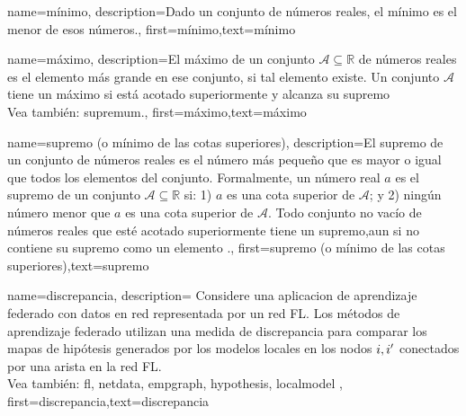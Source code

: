 
{
	name=mínimo,
	description={Dado un conjunto de números reales, el mínimo es el menor de esos números.},
	first={mínimo},text={mínimo}
}


{name=máximo,
     description={El máximo de un conjunto $\mathcal{A} \subseteq \mathbb{R}$ 
	 de números reales es el elemento más grande en ese conjunto, si tal elemento existe. Un conjunto $\mathcal{A}$ 
	 tiene un máximo si está acotado superiormente y alcanza su supremo \cite[Sec.~1.4]{RudinBookPrinciplesMatheAnalysis}
	 \\
		Vea también: \gls{supremum}.},
 first={máximo},text={máximo}
}

{name=supremo (o mínimo de las cotas superiores),
	description={El supremo de un conjunto de números reales es 
		el número más pequeño que es mayor o igual que todos los elementos del conjunto. Formalmente, un número real 
		$a$ es el supremo de un conjunto $\mathcal{A} \subseteq \mathbb{R}$ si: 1) $a$ 
		es una cota superior de $\mathcal{A}$; y 2) ningún número menor que $a$ es una cota superior de $\mathcal{A}$. 
		Todo conjunto no vacío de números reales que esté acotado superiormente tiene un supremo,aun si no contiene su supremo como un elemento \cite[Sec.~1.4]{RudinBookPrinciplesMatheAnalysis}.},
	first={supremo (o mínimo de las cotas superiores)},text={supremo}
}

{name=discrepancia,
	description={
		Considere una aplicacion de aprendizaje federado con datos en red 
		representada por un red FL. Los métodos de aprendizaje federado utilizan una medida de discrepancia para  
		comparar los mapas de hipótesis generados por los modelos locales en los nodos $i,i'$ 
		conectados por una arista en la red FL.
		\\
			Vea también: \gls{fl}, \gls{netdata}, \gls{empgraph}, \gls{hypothesis}, \gls{localmodel} },
	first={discrepancia},text={discrepancia}
}



